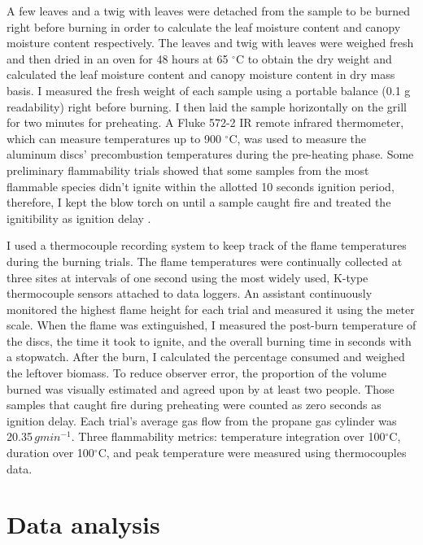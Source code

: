 \documentclass{ttuthes2007}
\begin{document}
A few leaves and a twig with leaves were detached from the sample to be burned right before burning in order to calculate the leaf moisture content and canopy moisture content respectively. The leaves and twig with leaves were weighed fresh and then dried in an oven for 48 hours at 65 $^{\circ}$C to obtain the dry weight and calculated the leaf moisture content and canopy moisture content in dry mass basis.
I measured the fresh weight of each sample using a portable balance (0.1 g readability) right before burning. %
I then laid the sample horizontally on the grill for two minutes for preheating. A Fluke 572-2 IR remote infrared thermometer, which can measure temperatures up to 900 $^{\circ}$C, was used to measure the aluminum discs' precombustion temperatures during the pre-heating phase. Some preliminary flammability trials %
showed that some samples from the most flammable species didn't ignite within the allotted 10 seconds ignition period, therefore, I kept the blow torch on until a sample caught fire and treated the ignitibility as ignition delay \citep{anderson1970forest}.  

I used a thermocouple recording system to keep track of the flame temperatures during the burning trials. The flame temperatures were continually collected at three sites at intervals of one second using the most widely used, K-type thermocouple sensors \citep{mcgranahan2020inconvenient} attached to data loggers. %
An assistant continuously monitored the highest flame height for each trial and measured it using the meter scale. When the flame was extinguished, I measured the post-burn temperature of the discs, the time it took to ignite, and the overall burning time in seconds with a stopwatch. After the burn, I calculated the percentage consumed and weighed the leftover biomass. To reduce observer error, the proportion of the volume burned was visually estimated and agreed upon by at least two people. Those samples that caught fire during preheating were counted as zero seconds as ignition delay. Each trial's average gas flow from the propane gas cylinder was 20.35\,$g min^{-1}$. Three flammability metrics: temperature integration over 100$^{\circ}$C, duration over 100$^{\circ}$C, and peak temperature were measured using thermocouples data.

\section{Data analysis}
\end{document}
